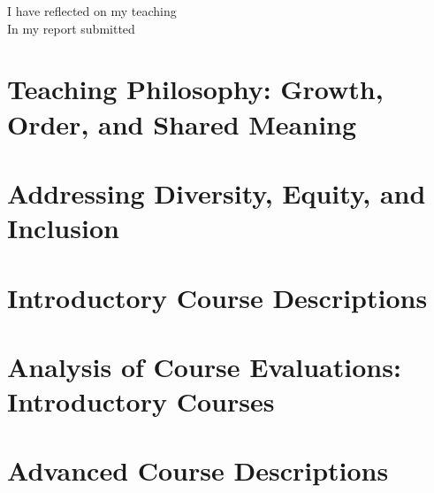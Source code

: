 \documentclass[../../main.tex]{subfiles}
\begin{document}
\label{sec:teaching}

I have reflected on my teaching
\\
\vspace{0.15cm}
In my report submitted

\section{Teaching Philosophy: Growth, Order, and Shared Meaning}
\label{sec:teaching_philosophy}

\begin{flushleft}

\end{flushleft}

\section{Addressing Diversity, Equity, and Inclusion}
\label{sec:equity_inclusion}

\begin{flushleft}

\end{flushleft}

\section{Introductory Course Descriptions}
\label{sec:intro}

\begin{flushleft}

\end{flushleft}

\section{Analysis of Course Evaluations: Introductory Courses}
\label{sec:intro_eval}

\begin{flushleft}

\end{flushleft}

\section{Advanced Course Descriptions}
\label{sec:adv}

\begin{flushleft}

\end{flushleft}
\end{document}
